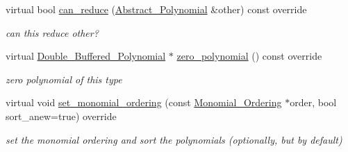 \begin{Indent}
\begin{DoxyCompactItemize}
virtual bool \hyperlink{group__polygroup_af01f234c0897a5a01590f9b35e7e566f}{can\+\_\+reduce} (\hyperlink{group__polygroup_class_abstract___polynomial}{Abstract\+\_\+\+Polynomial} \&other) const override
\begin{DoxyCompactList}\small\item\em can {\ttfamily this} reduce {\ttfamily other}? \end{DoxyCompactList}\item 
\mbox{\label{group__polygroup_a9485263fbd2bf13b0eb01926e6439238}} 
virtual \hyperlink{group__polygroup_class_double___buffered___polynomial}{Double\+\_\+\+Buffered\+\_\+\+Polynomial} $\ast$ \hyperlink{group__polygroup_a9485263fbd2bf13b0eb01926e6439238}{zero\+\_\+polynomial} () const override
\begin{DoxyCompactList}\small\item\em zero polynomial of this type \end{DoxyCompactList}\item 
virtual void \hyperlink{group__polygroup_aa81be797dcced4e663d3fe54f6501ed6}{set\+\_\+monomial\+\_\+ordering} (const \hyperlink{group__orderinggroup_class_monomial___ordering}{Monomial\+\_\+\+Ordering} $\ast$order, bool sort\+\_\+anew=true) override
\begin{DoxyCompactList}\small\item\em set the monomial ordering and sort the polynomials (optionally, but by default) \end{DoxyCompactList}\end{DoxyCompactItemize}
\end{Indent}
